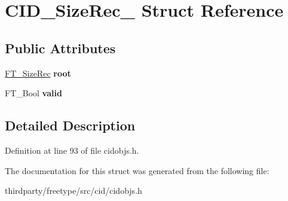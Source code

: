 \hypertarget{struct_c_i_d___size_rec__}{}\section{C\+I\+D\+\_\+\+Size\+Rec\+\_\+ Struct Reference}
\label{struct_c_i_d___size_rec__}
\subsection*{Public Attributes}
\begin{DoxyCompactItemize}
\item 
\mbox{\label{struct_c_i_d___size_rec___a1cdfb51148105a77b699bda3dd628765}} 
\hyperlink{struct_f_t___size_rec__}{F\+T\+\_\+\+Size\+Rec} {\bfseries root}
\item 
\mbox{\label{struct_c_i_d___size_rec___a6ef8879de28a88a016ea5324dd0d1e08}} 
F\+T\+\_\+\+Bool {\bfseries valid}
\end{DoxyCompactItemize}


\subsection{Detailed Description}


Definition at line 93 of file cidobjs.\+h.



The documentation for this struct was generated from the following file\+:\begin{DoxyCompactItemize}
\item 
thirdparty/freetype/src/cid/cidobjs.\+h\end{DoxyCompactItemize}
